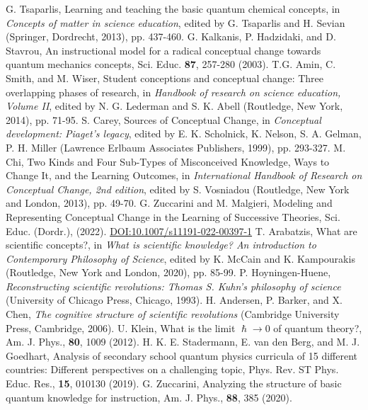 \documentclass[twocolumn,secnumarabic,amssymb, nobibnotes, aps, prd, nofootinbib]{revtex4-2}
\begin{document}
\begin{thebibliography}{99}
 G. Tsaparlis, Learning and teaching the basic quantum chemical concepts, in \textit{Concepts of matter in science education}, edited by G. Tsaparlis and H. Sevian (Springer, Dordrecht, 2013), pp. 437-460.
 G. Kalkanis, P. Hadzidaki, and D. Stavrou, An instructional model for a radical conceptual change towards quantum mechanics concepts, Sci. Educ. \textbf{87}, 257-280 (2003).
 T.G. Amin, C. Smith, and M. Wiser, Student conceptions and conceptual change: Three overlapping phases of research, in \textit{Handbook of research on science education, Volume II}, edited by N. G. Lederman and S. K. Abell (Routledge, New York, 2014), pp. 71-95.
 S. Carey, Sources of Conceptual Change, in \textit{Conceptual development: Piaget's legacy}, edited by E. K. Scholnick, K. Nelson, S. A. Gelman, P. H. Miller (Lawrence Erlbaum Associates Publishers, 1999), pp. 293-327.
 M. Chi, Two Kinds and Four Sub-Types of Misconceived Knowledge, Ways to Change It, and the Learning Outcomes, in \textit{International Handbook of Research on Conceptual Change, 2nd edition}, edited by S. Vosniadou (Routledge, New York and London, 2013), pp. 49-70.
 G. Zuccarini and M. Malgieri, Modeling and Representing Conceptual Change in the Learning of Successive Theories, Sci. Educ. (Dordr.), (2022). \href{https://doi.org/10.1007/s11191-022-00397-1}{DOI:10.1007/s11191-022-00397-1}
 T. Arabatzis, What are scientific concepts?, in \textit{What is scientific knowledge? An introduction to Contemporary Philosophy of Science}, edited by K. McCain and K. Kampourakis (Routledge, New York and London, 2020), pp. 85-99.
 P. Hoyningen-Huene, \textit{Reconstructing scientific revolutions: Thomas S. Kuhn's philosophy of science} (University of Chicago Press, Chicago, 1993).
 H. Andersen, P. Barker, and X. Chen, \textit{The cognitive structure of scientific revolutions} (Cambridge University Press, Cambridge, 2006).
 U. Klein, What is the limit $\hslash \to 0$ of quantum theory?, Am. J. Phys., \textbf{80}, 1009 (2012).
 H. K. E. Stadermann, E. van den Berg, and M. J. Goedhart, Analysis of secondary school quantum physics curricula of 15 different countries: Different perspectives on a challenging topic, Phys. Rev. ST Phys. Educ. Res., \textbf{15}, 010130 (2019).
 G. Zuccarini, Analyzing the structure of basic quantum knowledge for instruction, Am. J. Phys., \textbf{88}, 385 (2020).

\end{thebibliography}
\end{document}

